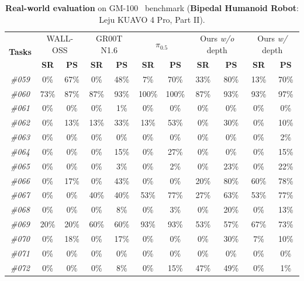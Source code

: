 \begin{table}[t]
  \centering
  \caption{\textbf{Real-world evaluation} on GM-100~\cite{gm100} benchmark (\textbf{Bipedal Humanoid Robot}: Leju KUAVO 4 Pro, Part II).}
  \small
  \setlength{\tabcolsep}{12pt}
    \begin{tabular}{ccccccccccc}
    \toprule
      \multirow{2}[2]{*}{\textbf{Tasks}} & \multicolumn{2}{c}{WALL-OSS} & \multicolumn{2}{c}{GR00T N1.6} &
    \multicolumn{2}{c}{$\pi_{0.5}$} & \multicolumn{2}{c}{Ours \textit{w/o} depth} & \multicolumn{2}{c}{Ours
    \textit{w/} depth} \\
  & \textbf{SR} & \textbf{PS} & \textbf{SR} & \textbf{PS} & \textbf{SR} & \textbf{PS} & \textbf{SR} &
  \textbf{PS} & \textbf{SR} & \textbf{PS} \\
    \midrule
      \textit{\#059} & 0\% & 67\% & 0\% & 48\% & 7\% & 70\% & 33\% & 80\% & 13\% & 70\% \\
      \textit{\#060} & 73\% & 87\% & 87\% & 93\% & 100\% & 100\% & 87\% & 93\% & 93\% & 97\% \\
      \textit{\#061} & 0\% & 0\% & 0\% & 1\% & 0\% & 0\% & 0\% & 0\% & 0\% & 0\% \\
      \textit{\#062} & 0\% & 13\% & 13\% & 33\% & 13\% & 53\% & 0\% & 30\% & 0\% & 10\% \\
      \textit{\#063} & 0\% & 0\% & 0\% & 0\% & 0\% & 0\% & 0\% & 0\% & 0\% & 2\% \\
      \textit{\#064} & 0\% & 0\% & 0\% & 15\% & 0\% & 27\% & 0\% & 0\% & 0\% & 15\% \\
      \textit{\#065} & 0\% & 0\% & 0\% & 3\% & 0\% & 2\% & 0\% & 23\% & 0\% & 22\% \\
      \textit{\#066} & 0\% & 17\% & 0\% & 43\% & 0\% & 0\% & 20\% & 80\% & 60\% & 78\% \\
      \textit{\#067} & 0\% & 0\% & 40\% & 40\% & 53\% & 77\% & 27\% & 63\% & 53\% & 77\% \\
      \textit{\#068} & 0\% & 0\% & 0\% & 8\% & 0\% & 3\% & 0\% & 20\% & 0\% & 13\% \\
      \textit{\#069} & 20\% & 20\% & 60\% & 60\% & 93\% & 93\% & 53\% & 57\% & 67\% & 73\% \\
      \textit{\#070} & 0\% & 18\% & 0\% & 17\% & 0\% & 0\% & 0\% & 30\% & 7\% & 10\% \\
      \textit{\#071} & 0\% & 0\% & 0\% & 0\% & 0\% & 0\% & 0\% & 0\% & 0\% & 0\% \\
      \textit{\#072} & 0\% & 0\% & 0\% & 8\% & 0\% & 15\% & 47\% & 49\% & 0\% & 1\% \\

\end{tabular}
\end{table}
